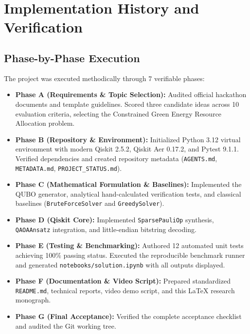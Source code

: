 \section{Implementation History and Verification}

\subsection{Phase-by-Phase Execution}
The project was executed methodically through 7 verifiable phases:
\begin{itemize}
    \item \textbf{Phase A (Requirements \& Topic Selection):} Audited official hackathon documents and template guidelines. Scored three candidate ideas across 10 evaluation criteria, selecting the Constrained Green Energy Resource Allocation problem.
    \item \textbf{Phase B (Repository \& Environment):} Initialized Python 3.12 virtual environment with modern Qiskit 2.5.2, Qiskit Aer 0.17.2, and Pytest 9.1.1. Verified dependencies and created repository metadata (\texttt{AGENTS.md}, \texttt{METADATA.md}, \texttt{PROJECT\_STATUS.md}).
    \item \textbf{Phase C (Mathematical Formulation \& Baselines):} Implemented the QUBO generator, analytical hand-calculated verification tests, and classical baselines (\texttt{BruteForceSolver} and \texttt{GreedySolver}).
    \item \textbf{Phase D (Qiskit Core):} Implemented \texttt{SparsePauliOp} synthesis, \texttt{QAOAAnsatz} integration, and little-endian bitstring decoding.
    \item \textbf{Phase E (Testing \& Benchmarking):} Authored 12 automated unit tests achieving 100\% passing status. Executed the reproducible benchmark runner and generated \texttt{notebooks/solution.ipynb} with all outputs displayed.
    \item \textbf{Phase F (Documentation \& Video Script):} Prepared standardized \texttt{README.md}, technical reports, video demo script, and this LaTeX research monograph.
    \item \textbf{Phase G (Final Acceptance):} Verified the complete acceptance checklist and audited the Git working tree.
\end{itemize}

